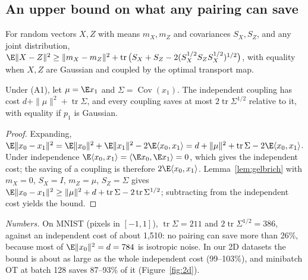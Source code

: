 \subsection{An upper bound on what any pairing can save}\label{app:d4}
\begin{lemma}\label{lem:gelbrich}
For random vectors $X,Z$ with means $m_X,m_Z$ and covariances $S_X,S_Z$, and any joint distribution,
$\E\|X-Z\|^2\ge\|m_X-m_Z\|^2+\operatorname{tr}\big(S_X+S_Z-2(S_X^{1/2}S_ZS_X^{1/2})^{1/2}\big)$, with equality when $X,Z$ are Gaussian and coupled by the optimal transport map.
\end{lemma}
\begin{proposition}\label{prop:bound}
Under (A1), let $\mu=\E x_1$ and $\Sigma=\operatorname{Cov}(x_1)$. The independent coupling has cost $d+\|\mu\|^2+\operatorname{tr}\Sigma$, and every coupling saves at most $2\operatorname{tr}\Sigma^{1/2}$ relative to it, with equality if $p_1$ is Gaussian.
\end{proposition}
\begin{proof}
Expanding, $\E\|x_0-x_1\|^2=\E\|x_0\|^2+\E\|x_1\|^2-2\E\langle x_0,x_1\rangle=d+\|\mu\|^2+\operatorname{tr}\Sigma-2\E\langle x_0,x_1\rangle$. Under independence $\E\langle x_0,x_1\rangle=\langle\E x_0,\E x_1\rangle=0$, which gives the independent cost; the saving of a coupling is therefore $2\E\langle x_0,x_1\rangle$. Lemma~\ref{lem:gelbrich} with $m_X=0$, $S_X=I$, $m_Z=\mu$, $S_Z=\Sigma$ gives $\E\|x_0-x_1\|^2\ge\|\mu\|^2+d+\operatorname{tr}\Sigma-2\operatorname{tr}\Sigma^{1/2}$; subtracting from the independent cost yields the bound.
\end{proof}
\emph{Numbers.} On MNIST (pixels in $[-1,1]$), $\operatorname{tr}\Sigma=211$ and $2\operatorname{tr}\Sigma^{1/2}=386$, against an independent cost of about 1,510: no pairing can save more than 26\%, because most of $\E\|x_0\|^2=d=784$ is isotropic noise. In our 2D datasets the bound is about as large as the whole independent cost (99--103\%), and minibatch OT at batch 128 saves 87--93\% of it (Figure~\ref{fig:2d}). %

